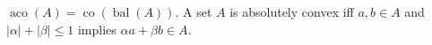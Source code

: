 $\operatorname{aco}(A) = \operatorname{co}(\operatorname{bal}(A))$. A set $A$ is absolutely convex iff $a,b \in A$ and $|\alpha|+|\beta| \leqslant 1$ implies $\alpha a + \beta b \in A$.

